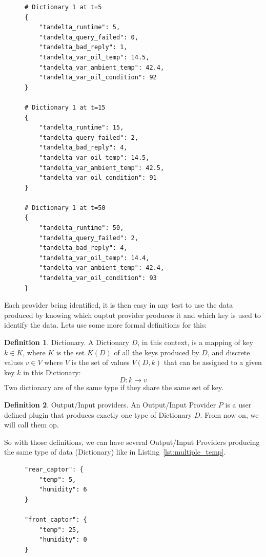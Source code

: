 \documentclass[12pt]{article}
\theoremstyle{definition}
\newtheorem{definition}{Definition}[section]
\theoremstyle{definition}
\theoremstyle{remark}
\begin{document}
\begin{figure}
\label{dictionary_sample}
\begin{lstlisting}[caption=Example of a data dictionnary received at different time.,label={lst:dictionary_sample}]
# Dictionary 1 at t=5
{
    "tandelta_runtime": 5,
    "tandelta_query_failed": 0,
    "tandelta_bad_reply": 1,
    "tandelta_var_oil_temp": 14.5,
    "tandelta_var_ambient_temp": 42.4,
    "tandelta_var_oil_condition": 92
}

# Dictionary 1 at t=15
{
    "tandelta_runtime": 15,
    "tandelta_query_failed": 2,
    "tandelta_bad_reply": 4,
    "tandelta_var_oil_temp": 14.5,
    "tandelta_var_ambient_temp": 42.5,
    "tandelta_var_oil_condition": 91
}

# Dictionary 1 at t=50
{
    "tandelta_runtime": 50,
    "tandelta_query_failed": 2,
    "tandelta_bad_reply": 4,
    "tandelta_var_oil_temp": 14.4,
    "tandelta_var_ambient_temp": 42.4,
    "tandelta_var_oil_condition": 93
}
\end{lstlisting}
\end{figure}

Each provider being identified, it is then easy in any test to use the data produced by knowing which ouptut provider produces it and which key is used to identify the data. Lets use some more formal definitions for this:

\theoremstyle{definition}
\begin{definition}{Dictionary.} A Dictionary $D$, in this context, is a mapping of key $k \in K$, where $K$ is the set $K(D)$ of all the keys produced by $D$, and discrete values $v \in V$ where $V$ is the set of values $V(D, k)$ that can be assigned to a given key $k$ in this Dictionary:
$$D: k \to v$$
Two dictionary are of the same type if they share the same set of key.
\end{definition}

\theoremstyle{definition}
\begin{definition}{Output/Input providers.} An Output/Input Provider $P$ is a user defined plugin that produces exactly one type of Dictionary $D$. From now on, we will call them \gls{op}.
\end{definition}

So with those definitions, we can have several Output/Input Providers producing the same type of data (Dictionary) like in Listing~\ref{lst:multiple_temp}.

\begin{figure}
\label{multiple_temp}
\begin{lstlisting}[caption=Example of a dictionnary that contains the same keys. Each one of them being identified by the name preceding the curly bracket,label={lst:multiple_temp}]
"rear_captor": {
    "temp": 5,
    "humidity": 6
}

"front_captor": {
    "temp": 25,
    "humidity": 0
}
\end{lstlisting}
\end{figure}
\end{document}

